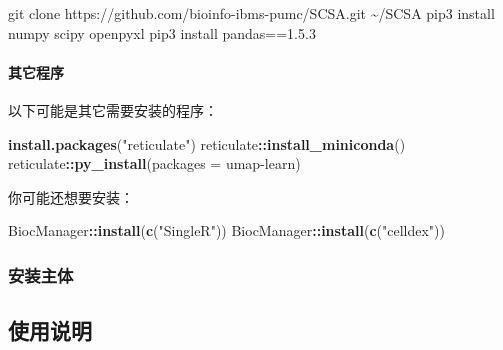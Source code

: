 \documentclass[
]{article}
\newenvironment{Shaded}{\begin{snugshade}}{\end{snugshade}}
\newcommand{\DataTypeTok}[1]{\textcolor[rgb]{0.13,0.29,0.53}{#1}}
\newcommand{\ExtensionTok}[1]{#1}
\newcommand{\FunctionTok}[1]{\textcolor[rgb]{0.00,0.00,0.00}{#1}}
\newcommand{\KeywordTok}[1]{\textcolor[rgb]{0.13,0.29,0.53}{\textbf{#1}}}
\newcommand{\NormalTok}[1]{#1}
\newcommand{\OperatorTok}[1]{\textcolor[rgb]{0.81,0.36,0.00}{\textbf{#1}}}
\newcommand{\StringTok}[1]{\textcolor[rgb]{0.31,0.60,0.02}{#1}}
\begin{document}
\begin{Shaded}
\begin{Highlighting}[]
\FunctionTok{git}\NormalTok{ clone https://github.com/bioinfo{-}ibms{-}pumc/SCSA.git \textasciitilde{}/SCSA}
\ExtensionTok{pip3}\NormalTok{ install numpy scipy openpyxl}
\ExtensionTok{pip3}\NormalTok{ install pandas==1.5.3}
\end{Highlighting}
\end{Shaded}

\hypertarget{installOthers}{%
\paragraph{其它程序}\label{installOthers}}

以下可能是其它需要安装的程序：

\begin{Shaded}
\begin{Highlighting}[]
\KeywordTok{install.packages}\NormalTok{(}\StringTok{"reticulate"}\NormalTok{)}
\NormalTok{reticulate}\OperatorTok{::}\KeywordTok{install\_miniconda}\NormalTok{()}
\NormalTok{reticulate}\OperatorTok{::}\KeywordTok{py\_install}\NormalTok{(}\DataTypeTok{packages =} \StringTok{\textquotesingle{}umap{-}learn\textquotesingle{}}\NormalTok{)}
\end{Highlighting}
\end{Shaded}

你可能还想要安装：

\begin{Shaded}
\begin{Highlighting}[]
\NormalTok{BiocManager}\OperatorTok{::}\KeywordTok{install}\NormalTok{(}\KeywordTok{c}\NormalTok{(}\StringTok{"SingleR"}\NormalTok{))}
\NormalTok{BiocManager}\OperatorTok{::}\KeywordTok{install}\NormalTok{(}\KeywordTok{c}\NormalTok{(}\StringTok{"celldex"}\NormalTok{))}
\end{Highlighting}
\end{Shaded}

\hypertarget{ux5b89ux88c5ux4e3bux4f53}{%
\subsubsection{安装主体}\label{ux5b89ux88c5ux4e3bux4f53}}

\hypertarget{ux4f7fux7528ux8bf4ux660e}{%
\subsection{使用说明}\label{ux4f7fux7528ux8bf4ux660e}}
\end{document}
